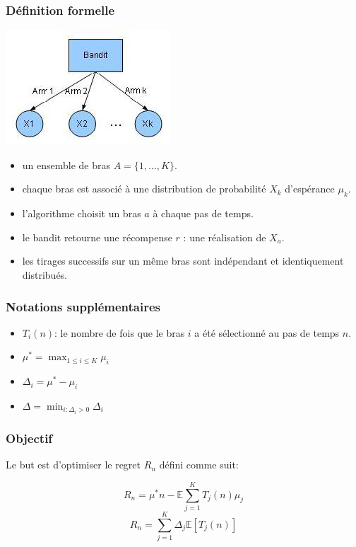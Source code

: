 \documentclass[compress, color = usenames, dvipsnames]{beamer}
\begin{document}
\begin{frame}
    \frametitle{Définition formelle}
    \begin{center}
        \includegraphics[scale=0.5]{figs/bandit.jpg}
    \end{center}
    \begin{itemize}
        \item un ensemble de bras $A=\{1,...,K\}$.
        \item chaque bras est associé à une distribution de probabilité $X_k$ d'espérance $\mu_k$.
        \item l'algorithme choisit un bras $a$ à chaque pas de temps.
        \item le bandit retourne une récompense $r$ : une réalisation de $X_a$.
        \item les tirages successifs sur un même bras sont indépendant et identiquement distribués.
    \end{itemize}
\end{frame}



\begin{frame}
    \frametitle{Notations supplémentaires}
    \begin{itemize}
        \item $T_i(n)$: le nombre de fois que le bras $i$ a été sélectionné au pas de temps $n$.
        \item $\mu^* = \max_{1 \le i \le K}\mu_i$
        \item $\Delta_i = \mu^* - \mu_i$ 
        \item $\Delta = \min_{i:\Delta_i > 0}\Delta_i$
    \end{itemize}


\end{frame}


\begin{frame}
    \frametitle{Objectif}

    Le but est d'optimiser le regret $R_n$ défini comme suit:

    $$R_n=\mu^*n - \mathbb{E} \sum_{j=1}^{K}  T_j(n) \mu_j$$
    $$R_n=\sum_{j=1}^{K} \Delta_j \mathbb{E} [T_j(n)]$$

\end{frame}
\end{document}
